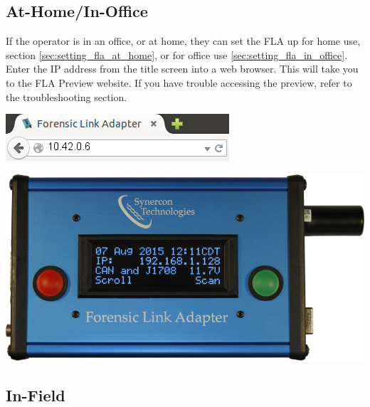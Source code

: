 \documentclass[11pt, oneside]{book}
\begin{document}
\paragraph{  }
\subsection{At-Home/In-Office}
If the operator is in an office, or at home, they can set the FLA up for home use, section \ref{sec:setting_fla_at_home}, or for office use \ref{sec:setting_fla_in_office}. Enter the IP address from the title screen into a web browser. This will take you to the FLA Preview website. If you have trouble accessing the preview, refer to the troubleshooting section.
\\[\baselineskip]
\noindent\begin{minipage}{0.45\textwidth}%
	\includegraphics[width=\linewidth]{../media/fla_preview_screenshots/url_correct} 
\end{minipage}%
\hfill%
\begin{minipage}{0.45\textwidth} 
	\includegraphics[width=\linewidth]{../media/fla_screens/ethernet_and_others/main/title_both}
\end{minipage}
\subsection{In-Field}
\end{document}
